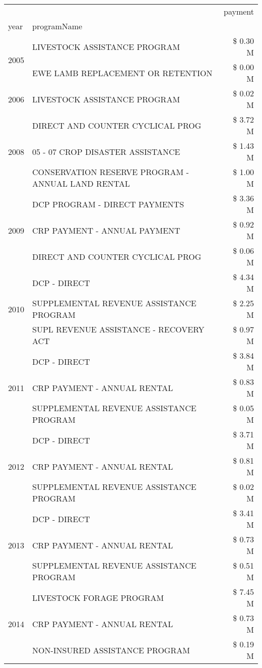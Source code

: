 \begin{tabular}{llr}
\toprule
 &  & payment \\
year & programName &  \\
\midrule
\multirow[t]{2}{*}{2005} & LIVESTOCK ASSISTANCE PROGRAM & \$ 0.30 M \\
 & EWE LAMB REPLACEMENT OR RETENTION & \$ 0.00 M \\
\cline{1-3}
2006 & LIVESTOCK ASSISTANCE PROGRAM & \$ 0.02 M \\
\cline{1-3}
\multirow[t]{3}{*}{2008} & DIRECT AND COUNTER CYCLICAL PROG & \$ 3.72 M \\
 & 05 - 07 CROP DISASTER ASSISTANCE & \$ 1.43 M \\
 & CONSERVATION RESERVE PROGRAM - ANNUAL LAND RENTAL & \$ 1.00 M \\
\cline{1-3}
\multirow[t]{3}{*}{2009} & DCP PROGRAM - DIRECT PAYMENTS & \$ 3.36 M \\
 & CRP PAYMENT - ANNUAL PAYMENT & \$ 0.92 M \\
 & DIRECT AND COUNTER CYCLICAL PROG & \$ 0.06 M \\
\cline{1-3}
\multirow[t]{3}{*}{2010} & DCP - DIRECT & \$ 4.34 M \\
 & SUPPLEMENTAL REVENUE ASSISTANCE PROGRAM & \$ 2.25 M \\
 & SUPL REVENUE ASSISTANCE - RECOVERY ACT & \$ 0.97 M \\
\cline{1-3}
\multirow[t]{3}{*}{2011} & DCP - DIRECT & \$ 3.84 M \\
 & CRP PAYMENT - ANNUAL RENTAL & \$ 0.83 M \\
 & SUPPLEMENTAL REVENUE ASSISTANCE PROGRAM & \$ 0.05 M \\
\cline{1-3}
\multirow[t]{3}{*}{2012} & DCP - DIRECT & \$ 3.71 M \\
 & CRP PAYMENT - ANNUAL RENTAL & \$ 0.81 M \\
 & SUPPLEMENTAL REVENUE ASSISTANCE PROGRAM & \$ 0.02 M \\
\cline{1-3}
\multirow[t]{3}{*}{2013} & DCP - DIRECT & \$ 3.41 M \\
 & CRP PAYMENT - ANNUAL RENTAL & \$ 0.73 M \\
 & SUPPLEMENTAL REVENUE ASSISTANCE PROGRAM & \$ 0.51 M \\
\cline{1-3}
\multirow[t]{3}{*}{2014} & LIVESTOCK FORAGE PROGRAM & \$ 7.45 M \\
 & CRP PAYMENT - ANNUAL RENTAL & \$ 0.73 M \\
 & NON-INSURED ASSISTANCE PROGRAM & \$ 0.19 M \\

\end{tabular}
